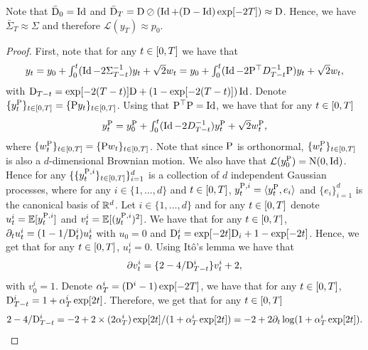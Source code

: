 Note that $\bar{\mathrm{D}}_0 = \operatorname{Id}$ and
$\bar{\mathrm{D}}_T = \mathrm{D} \oslash (\operatorname{Id} + (\mathrm{D} - \operatorname{Id})\exp[-2T]) \approx \mathrm{D}$. Hence,
we have $\bar{\Sigma}_T \approx \Sigma$ and therefore
$\mathcal{L}(y_T) \approx p_0$.

\begin{proof}
  First, note that for any $t \in \left[0,T\right]$ we have that
  \begin{equation}
    \textstyle{
      y_t = y_0 + \int_0^t ( \operatorname{Id}- 2\Sigma_{T-t}^{-1}) y_t + \sqrt{2} w_t = y_0 + \int_0^t ( \operatorname{Id}- 2\mathrm{P}^\top D_{T-t}^{-1} \mathrm{P}) y_t + \sqrt{2} w_t ,
      }
  \end{equation}
  with $\mathrm{D}_{T-t} = \exp[-2(T-t)] \mathrm{D} + (1 - \exp[-2(T-t)]) \operatorname{Id}$. Denote
  $\{y_t^{\mathrm{P}}\}_{t \in \left[0,T\right]} = \{\mathrm{P} y_t\}_{t \in
    \left[0,T\right]}$. Using that $\mathrm{P}^\top \mathrm{P} = \operatorname{Id}$, we have that for any
  $t \in \left[0,T\right]$
  \begin{equation}
    \textstyle{
      y_t^{\mathrm{P}}=y_0^{\mathrm{P}}+ \int_0^t ( \operatorname{Id}- 2 D_{T-t}^{-1}) y_t^{\mathrm{P}}+ \sqrt{2} w_t^{\mathrm{P}},
      }
    \end{equation}
    where $\{w_t^{\mathrm{P}}\}_{t \in \left[0,T\right]} = \{\mathrm{P} w_t\}_{t \in
      \left[0,T\right]}$. Note that since $\mathrm{P}$ is orthonormal,
    $\{w_t^{\mathrm{P}}\}_{t \in \left[0,T\right]}$ is also a $d$-dimensional Brownian
    motion. We also have that $\mathcal{L}(y_0^{\mathrm{P}}) = \mathrm{N}(0,
    \operatorname{Id})$. Hence for any $\{\{y_t^{\mathrm{P}, i}\}_{t\in \left[0,T\right]}\}_{i=1}^d$ is a
    collection of $d$ independent Gaussian processes, where for any
    $i \in \{1, \dots, d\}$ and $t \in \left[0,T\right]$,
    $y_t^{\mathrm{P}, i} = \langle y_t^{\mathrm{P}}, e_i \rangle$ and $\{e_i\}_{i=1}^d$ is
    the canonical basis of $\mathbb{R}^d$. Let $i \in \{1, \dots, d\}$ and for any
    $t \in \left[0,T\right]$ denote $u_t^i = \mathbb{E} [ y_t^{\mathrm{P}, i} ]$ and
    $v_t^i = \mathbb{E} [ (y_t^{\mathrm{P}, i})^2 ]$. We have that for any
    $t \in \left[0,T\right]$, $\partial_t u_t^i = (1 - 1/\mathrm{D}_t^i) u_t^i$ with
    $u_0 =0$ and $\mathrm{D}_t^i = \exp[-2t] \mathrm{D}_i + 1 - \exp[-2t]$. Hence, we get
    that for any $t \in \left[0,T\right]$, $u_t^i = 0$. Using It\^o's lemma we have
    that
    \begin{equation}
      \label{eq:edo}
      \partial v_t^i = \{ 2 - 4 / \mathrm{D}_{T-t}^i \} v_t^i + 2 ,
    \end{equation}
    with $v_0^i = 1$. Denote $\alpha^i_T = (\mathrm{D}^i - 1)\exp[-2T]$, we have that
    for any $t \in \left[0,T\right]$, $\mathrm{D}_{T-t}^i = 1 + \alpha^i_T
    \exp[2t]$. Therefore, we get that for any $t \in \left[0,T\right]$
    \begin{equation}
      2 - 4 / \rmD_{T-t}^i = -2 + 2 \times (2\alpha_T^i)\exp[2t] /(1 + \alpha_T^i \exp[2t]) = - 2 + 2 \partial_t \log(1 + \alpha_T^i \exp[2t]) .

\end{equation}
\end{proof}
